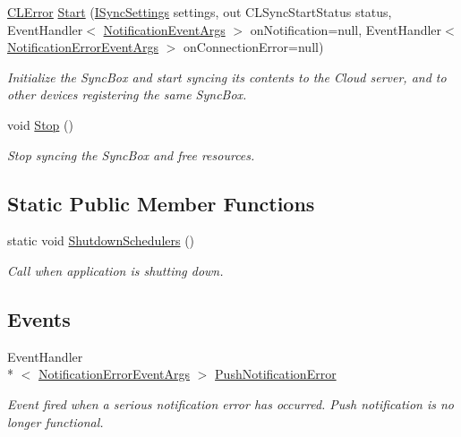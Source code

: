 \begin{DoxyCompactItemize}
\hyperlink{class_cloud_api_public_1_1_model_1_1_c_l_error}{C\-L\-Error} \hyperlink{class_cloud_api_public_1_1_c_l_sync_a87c00cb5f140959bf0a26a43bdd87cf5}{Start} (\hyperlink{interface_cloud_api_public_1_1_interfaces_1_1_i_sync_settings}{I\-Sync\-Settings} settings, out C\-L\-Sync\-Start\-Status status, Event\-Handler$<$ \hyperlink{class_cloud_api_public_1_1_push_notification_1_1_notification_event_args}{Notification\-Event\-Args} $>$ on\-Notification=null, Event\-Handler$<$ \hyperlink{class_cloud_api_public_1_1_push_notification_1_1_notification_error_event_args}{Notification\-Error\-Event\-Args} $>$ on\-Connection\-Error=null)
\begin{DoxyCompactList}\small\item\em Initialize the Sync\-Box and start syncing its contents to the Cloud server, and to other devices registering the same Sync\-Box. \end{DoxyCompactList}\item 
void \hyperlink{class_cloud_api_public_1_1_c_l_sync_aa76639968094d5dec2ec19e10163612f}{Stop} ()
\begin{DoxyCompactList}\small\item\em Stop syncing the Sync\-Box and free resources. \end{DoxyCompactList}\end{DoxyCompactItemize}
\subsection*{Static Public Member Functions}
\begin{DoxyCompactItemize}
\item 
static void \hyperlink{class_cloud_api_public_1_1_c_l_sync_a150338311c93398031613a014205d319}{Shutdown\-Schedulers} ()
\begin{DoxyCompactList}\small\item\em Call when application is shutting down. \end{DoxyCompactList}\end{DoxyCompactItemize}
\subsection*{Events}
\begin{DoxyCompactItemize}
\item 
Event\-Handler\\*
$<$ \hyperlink{class_cloud_api_public_1_1_push_notification_1_1_notification_error_event_args}{Notification\-Error\-Event\-Args} $>$ \hyperlink{class_cloud_api_public_1_1_c_l_sync_a986a038f0f504de78c6ea811dacb0b21}{Push\-Notification\-Error}
\begin{DoxyCompactList}\small\item\em Event fired when a serious notification error has occurred. Push notification is no longer functional. \end{DoxyCompactList}\end{DoxyCompactItemize}



